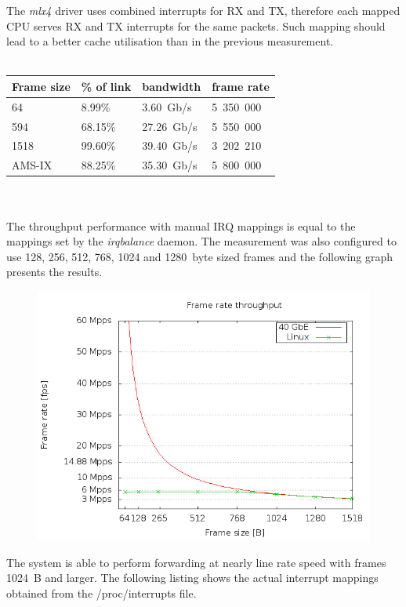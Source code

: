 The {\it{mlx4}} driver uses combined interrupts for RX and TX,
therefore each mapped CPU serves RX and TX interrupts for the same packets.
Such mapping should lead to a better cache utilisation than in the previous measurement.
\\
\\
\begin{tabular}{ | l | l | l | l |}
\hline
Frame size & \% of link & bandwidth & frame rate \\
\hline
64     &  8.99\% &  3.60~Gb/s & 5~350~000 \\
594    & 68.15\% & 27.26~Gb/s & 5~550~000 \\
1518   & 99.60\% & 39.40~Gb/s & 3~202~210 \\
AMS-IX & 88.25\% & 35.30~Gb/s & 5~800~000 \\
\hline
\end{tabular}
\\
\\
The throughput performance with manual IRQ mappings is equal to the mappings set by the {\it{irqbalance}} daemon.
The measurement was also configured to use 128, 256, 512, 768, 1024 and 1280~byte sized frames
and the following graph presents the results.
\begin{figure}[H]
	\centering
	\includegraphics[width=12cm,keepaspectratio]{fig/frames.png}
\end{figure}
\noindent
The system is able to perform forwarding at nearly line rate speed with frames 1024~B and larger.
The following listing shows the actual interrupt mappings obtained from the /proc/interrupts file.
\newpage
